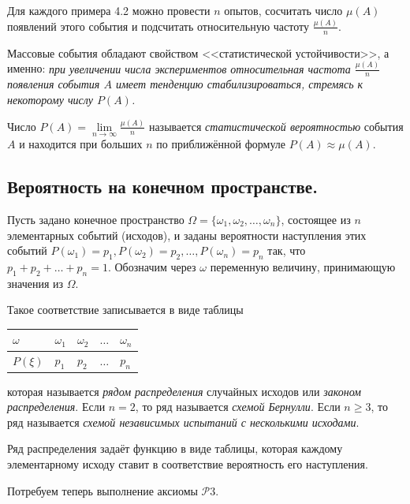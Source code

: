 Для каждого примера 4.2 можно провести $n$ опытов, сосчитать число $\mu(A)$ появлений этого события и подсчитать относительную частоту $\frac{\mu(A)}{n}$.

Массовые события обладают свойством <<статистической устойчивости>>, а именно: \textit{при увеличении числа экспериментов относительная частота $\frac{\mu(A)}{n}$
появления события $A$ имеет тенденцию стабилизироваться, стремясь к некоторому числу $P(A)$.}
\begin{definition}
Число $P(A) = \lim\limits_{n\to\infty} \frac{\mu(A)}{n}$ называется \textit{статистической вероятностью} события $A$ и находится при больших $n$ по приближённой формуле $P(A)\approx \mu(A)$.
\end{definition} 

\subsection{Вероятность на конечном пространстве.}
Пусть задано конечное пространство $\Omega=\{\omega_1,\omega_2,\ldots,\omega_n\}$, состоящее из $n$ элементарных событий (исходов), и заданы вероятности наступления этих
событий $P(\omega_1 ) = p_1 , P(\omega_2 ) = p_2 , \ldots , P(\omega_n ) = p_n$ так, что $p_1 + p_2 + \ldots + p_n = 1$.
Обозначим через $\omega$ переменную величину, принимающую значения из $\Omega$.

\begin{definition}
Такое соответствие записывается в виде таблицы
\begin{center}
	\begin{tabular}{|l|l|l|l|l|}
		\hline
		$\omega$ & $\omega_1$ & $\omega_2$ & $\ldots$ & $\omega_n$ \\ \hline
		$P(\xi)$  & $p_1$ & $p_2$ & $\ldots$  & $p_n$ \\ \hline
	\end{tabular}
\end{center}


которая называется \textit{рядом распределения} случайных исходов или \textit{законом
распределения}. Если $n = 2$, то ряд называется \textit{схемой Бернулли}. Если $n \geq 3$,
то ряд называется \textit{схемой независимых испытаний с несколькими исходами}.
\end{definition}

Ряд распределения задаёт функцию в виде таблицы, которая каждому элементарному исходу ставит в соответствие вероятность его наступления.

Потребуем теперь выполнение аксиомы $\mathcal{P}3$.

